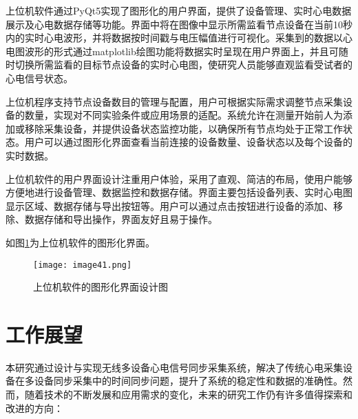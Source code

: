 上位机软件通过PyQt5实现了图形化的用户界面，提供了设备管理、实时心电数据展示及心电数据存储等功能。界面中将在图像中显示所需监看节点设备在当前10秒内的实时心电波形，并将数据按时间戳与电压幅值进行可视化。采集到的数据以心电图波形的形式通过matplotlib绘图功能将数据实时呈现在用户界面上，并且可随时切换所需监看的目标节点设备的实时心电图，使研究人员能够直观监看受试者的心电信号状态。

上位机程序支持节点设备数目的管理与配置，用户可根据实际需求调整节点采集设备的数量，实现对不同实验条件或应用场景的适配。系统允许在测量开始前人为添加或移除采集设备，并提供设备状态监控功能，以确保所有节点均处于正常工作状态。用户可以通过图形化界面查看当前连接的设备数量、设备状态以及每个设备的实时数据。

上位机软件的用户界面设计注重用户体验，采用了直观、简洁的布局，使用户能够方便地进行设备管理、数据监控和数据存储。界面主要包括设备列表、实时心电图显示区域、数据存储与导出按钮等。用户可以通过点击按钮进行设备的添加、移除、数据存储和导出操作，界面友好且易于操作。

如图\ref{F.ECG_image41}为上位机软件的图形化界面。

\begin{figure}[htb]
    \centering
    \texttt{[image: image41.png]}
    \caption{上位机软件的图形化界面设计图}
    \label{F.ECG_image41}
\end{figure}

\section{工作展望}

本研究通过设计与实现无线多设备心电信号同步采集系统，解决了传统心电采集设备在多设备同步采集中的时间同步问题，提升了系统的稳定性和数据的准确性。然而，随着技术的不断发展和应用需求的变化，未来的研究工作仍有许多值得探索和改进的方向：

